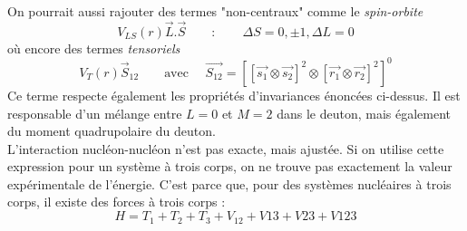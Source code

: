 On pourrait aussi rajouter des termes "non-centraux" comme le \textit{spin-orbite}
\begin{equation}
V_{LS}(r)\vec{L}.\vec{S} \qquad :\qquad \Delta S =0,\pm 1, \Delta L = 0
\end{equation}
où encore des termes \textit{tensoriels}
\begin{equation}
V_T(r)\vec{S}_{12}\qquad \text{avec }\quad \vec{S_{12}} = [[\vec{s_1}\otimes \vec{s_2}]^2\otimes
[\vec{r_1}\otimes \vec{r_2}]^2]^0
\end{equation}
Ce terme respecte également les propriétés d'invariances énoncées ci-dessus. Il est responsable d'un
mélange entre $L=0$ et $M=2$ dans le deuton, mais également du moment quadrupolaire du deuton.\\

L'interaction nucléon-nucléon n'est pas exacte, mais ajustée. Si on utilise cette expression pour un 
système à trois corps, on ne trouve pas exactement la valeur expérimentale de l'énergie. C'est parce que,
pour des systèmes nucléaires à trois corps, il existe des forces à trois corps :
\begin{equation}
H = T_1+T_2+T_3 + V_{12}+V{13}+V{23}+V{123}
\end{equation}